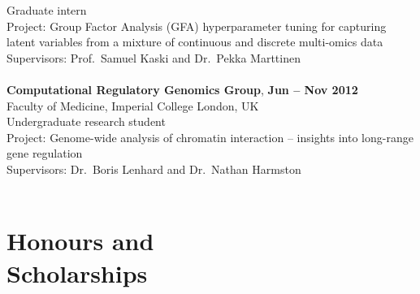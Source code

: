 \documentclass[margin,line]{resume}
\begin{document}
\begin{resume}
Graduate intern \\ Project: Group Factor Analysis (GFA) hyperparameter tuning for capturing latent variables from a mixture of continuous and discrete multi-omics data  \\
 \hspace{2mm} Supervisors: Prof.~Samuel Kaski and Dr.~Pekka Marttinen  \\ \vspace{1mm}\\%
\textbf{Computational Regulatory Genomics Group}, \hfill \textbf{Jun -- Nov 2012}\\Faculty of Medicine, Imperial College London, UK  \vspace{1mm}\\
 Undergraduate research student \\ Project: Genome-wide analysis of chromatin interaction -- insights into long-range gene regulation \\
 \hspace{2mm} Supervisors: Dr.~Boris Lenhard  and Dr.~Nathan Harmston \vspace{-2mm}\\ \\%
 
\newpage    
    \section{\mysidestyle Honours and\\Scholarships} 


\end{resume}
\end{document}
